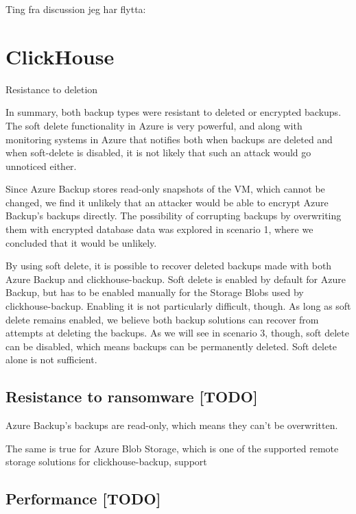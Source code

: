 Ting fra discussion jeg har flytta:
\section{ClickHouse}

Resistance to deletion

In summary, both backup types were resistant to deleted or encrypted backups. 
The soft delete functionality in Azure is very powerful, and along with monitoring systems in Azure that notifies both when backups are deleted and when soft-delete is disabled, it is not likely that such an attack would go unnoticed either. 

Since Azure Backup stores read-only snapshots of the VM,
which cannot be changed, we find it unlikely that an attacker would be able to encrypt Azure Backup's backups directly.
The possibility of corrupting backups by overwriting them with encrypted database data was explored in scenario 1,
where we concluded that it would be unlikely.

By using soft delete, it is possible to recover deleted backups made with both Azure Backup and clickhouse-backup.
Soft delete is enabled by default for Azure Backup,
but has to be enabled manually for the Storage Blobs used by clickhouse-backup.
Enabling it is not particularly difficult, though.
As long as soft delete remains enabled, we believe both backup solutions can recover from attempts at deleting the backups.
As we will see in scenario 3, though, soft delete can be disabled,
which means backups can be permanently deleted. Soft delete alone is not sufficient.



\subsection{Resistance to ransomware [TODO]}

Azure Backup's backups are read-only, which means they can't be overwritten.

The same is true for 
Azure Blob Storage, which is one of the supported remote storage solutions for clickhouse-backup,
support 

\subsection{Performance [TODO]}





